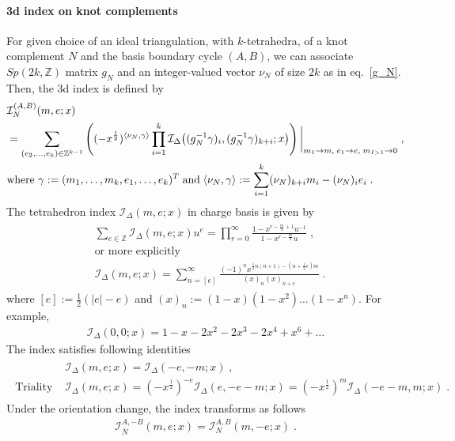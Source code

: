 \documentclass[a4paper,11pt]{article}
\def\cI{\mathcal{I}}
\begin{document}
\paragraph{3d index on knot complements} For given choice of an ideal triangulation, with $k$-tetrahedra, of a knot complement $N$ and the basis boundary cycle $(A,B)$, we can associate $Sp(2k,\mathbb{Z})$ matrix $g_N$ and an integer-valued vector $\nu_N$ of size $2k$ as in eq.~\eqref{g_N}. Then, the 3d index is defined by  \cite{Dimofte:2011py}
%
\begin{align}
\begin{split}
&\cI_{N}^{(A,B)} (m,e;x) 
\\
&=\sum_{(e_2,\ldots,e_{k}) \in \mathbb{Z}^{k-1}} \left( (-x^{\frac{1}2})^{\langle \nu_N, \gamma \rangle } \prod_{i=1}^k  \cI_{\Delta} \big{(}(g_N^{-1}  \gamma)_i , (g_N^{-1}  \gamma)_{k+i} ;x \big{)} \right)\bigg{|}_{m_1 \rightarrow m, \;e_1\rightarrow e, \;m_{I>1} \rightarrow 0} \;, 
\\
&\textrm{where } \gamma := (m_1,\ldots, m_k, e_1, \ldots, e_k)^T\; \textrm{and}\; \langle \nu_N, \gamma \rangle := \sum_{i=1}^k (\nu_N)_{k+i}m_i-(\nu_N)_i e_i\;.
\label{3d index-1}
\end{split}
\end{align}
%
The tetrahedron index  $\cI_{\Delta}(m,e;x)$ in charge basis is given by \cite{Dimofte:2011py}%
\begin{align}
\begin{split}
&\sum_{e\in \mathbb{Z}}\cI_{\Delta}(m,e;x)u^e = \prod_{r=0}^{\infty} \frac{1-x^{r-\frac{m}{2}+1}u^{-1}}{1- x^{r -\frac{m}{2}} u}\;, 
\\
&\textrm{or more explicitly} 
\\
&\mathcal{I}_{\Delta} (m,e;x) = \sum_{n=[e]}^\infty \frac{(-1)^n x^{\frac{1}2 n (n+1)-(n+\frac{1}2 e)m}}{(x)_n(x)_{n+e}} \;.
\label{tetrahdron index}
\end{split}
\end{align}
%
where $[e]:=\frac{1}2 (|e|-e)$ and $(x)_n:= (1-x)(1-x^2)\ldots (1-x^n)$.
For example,
%
\begin{align}
\cI_{\Delta}(0,0;x) = 1-x-2x^2-2x^3-2x^4+x^6+\ldots
\end{align}
%
The index satisfies following identities
%
\begin{align}
\begin{split}
&\cI_{\Delta}(m,e;x)=\cI_\Delta (-e,-m;x)\;, 
\\
\textrm{Triality : }& \cI_{\Delta}(m,e;x)=  (-x^{\frac{1}2})^{-e}\cI_{\Delta}(e,-e-m;x)= (-x^{\frac{1}2})^m \cI_{\Delta}(-e-m,m;x)\;.
\end{split}
\end{align}
%
Under the orientation change, the index transforms as follows
%
\begin{align}
\cI_{\overline{N}}^{A,-B} (m,e;x) = \cI_{N}^{A,B} (m,-e;x)\;. \label{Index under orientation reversal}
\end{align}
%
\end{document}
